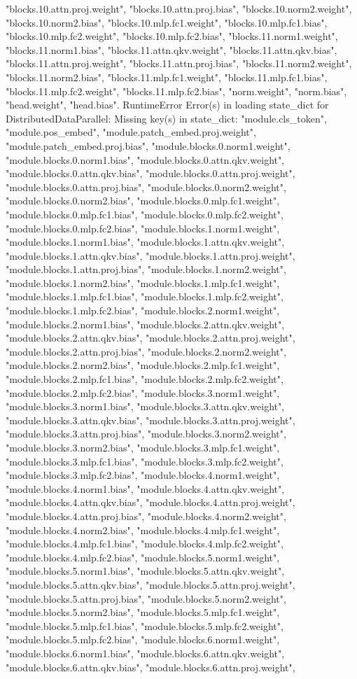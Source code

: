 "blocks.10.attn.proj.weight", "blocks.10.attn.proj.bias", "blocks.10.norm2.weight", "blocks.10.norm2.bias", "blocks.10.mlp.fc1.weight", "blocks.10.mlp.fc1.bias", "blocks.10.mlp.fc2.weight", "blocks.10.mlp.fc2.bias", "blocks.11.norm1.weight", "blocks.11.norm1.bias", "blocks.11.attn.qkv.weight", "blocks.11.attn.qkv.bias", "blocks.11.attn.proj.weight", "blocks.11.attn.proj.bias", "blocks.11.norm2.weight", "blocks.11.norm2.bias", "blocks.11.mlp.fc1.weight", "blocks.11.mlp.fc1.bias", "blocks.11.mlp.fc2.weight", "blocks.11.mlp.fc2.bias", "norm.weight", "norm.bias", "head.weight", "head.bias". RuntimeError
Error(s) in loading state_dict for DistributedDataParallel:
	Missing key(s) in state_dict: "module.cls_token", "module.pos_embed", "module.patch_embed.proj.weight", "module.patch_embed.proj.bias", "module.blocks.0.norm1.weight", "module.blocks.0.norm1.bias", "module.blocks.0.attn.qkv.weight", "module.blocks.0.attn.qkv.bias", "module.blocks.0.attn.proj.weight", "module.blocks.0.attn.proj.bias", "module.blocks.0.norm2.weight", "module.blocks.0.norm2.bias", "module.blocks.0.mlp.fc1.weight", "module.blocks.0.mlp.fc1.bias", "module.blocks.0.mlp.fc2.weight", "module.blocks.0.mlp.fc2.bias", "module.blocks.1.norm1.weight", "module.blocks.1.norm1.bias", "module.blocks.1.attn.qkv.weight", "module.blocks.1.attn.qkv.bias", "module.blocks.1.attn.proj.weight", "module.blocks.1.attn.proj.bias", "module.blocks.1.norm2.weight", "module.blocks.1.norm2.bias", "module.blocks.1.mlp.fc1.weight", "module.blocks.1.mlp.fc1.bias", "module.blocks.1.mlp.fc2.weight", "module.blocks.1.mlp.fc2.bias", "module.blocks.2.norm1.weight", "module.blocks.2.norm1.bias", "module.blocks.2.attn.qkv.weight", "module.blocks.2.attn.qkv.bias", "module.blocks.2.attn.proj.weight", "module.blocks.2.attn.proj.bias", "module.blocks.2.norm2.weight", "module.blocks.2.norm2.bias", "module.blocks.2.mlp.fc1.weight", "module.blocks.2.mlp.fc1.bias", "module.blocks.2.mlp.fc2.weight", "module.blocks.2.mlp.fc2.bias", "module.blocks.3.norm1.weight", "module.blocks.3.norm1.bias", "module.blocks.3.attn.qkv.weight", "module.blocks.3.attn.qkv.bias", "module.blocks.3.attn.proj.weight", "module.blocks.3.attn.proj.bias", "module.blocks.3.norm2.weight", "module.blocks.3.norm2.bias", "module.blocks.3.mlp.fc1.weight", "module.blocks.3.mlp.fc1.bias", "module.blocks.3.mlp.fc2.weight", "module.blocks.3.mlp.fc2.bias", "module.blocks.4.norm1.weight", "module.blocks.4.norm1.bias", "module.blocks.4.attn.qkv.weight", "module.blocks.4.attn.qkv.bias", "module.blocks.4.attn.proj.weight", "module.blocks.4.attn.proj.bias", "module.blocks.4.norm2.weight", "module.blocks.4.norm2.bias", "module.blocks.4.mlp.fc1.weight", "module.blocks.4.mlp.fc1.bias", "module.blocks.4.mlp.fc2.weight", "module.blocks.4.mlp.fc2.bias", "module.blocks.5.norm1.weight", "module.blocks.5.norm1.bias", "module.blocks.5.attn.qkv.weight", "module.blocks.5.attn.qkv.bias", "module.blocks.5.attn.proj.weight", "module.blocks.5.attn.proj.bias", "module.blocks.5.norm2.weight", "module.blocks.5.norm2.bias", "module.blocks.5.mlp.fc1.weight", "module.blocks.5.mlp.fc1.bias", "module.blocks.5.mlp.fc2.weight", "module.blocks.5.mlp.fc2.bias", "module.blocks.6.norm1.weight", "module.blocks.6.norm1.bias", "module.blocks.6.attn.qkv.weight", "module.blocks.6.attn.qkv.bias", "module.blocks.6.attn.proj.weight", 